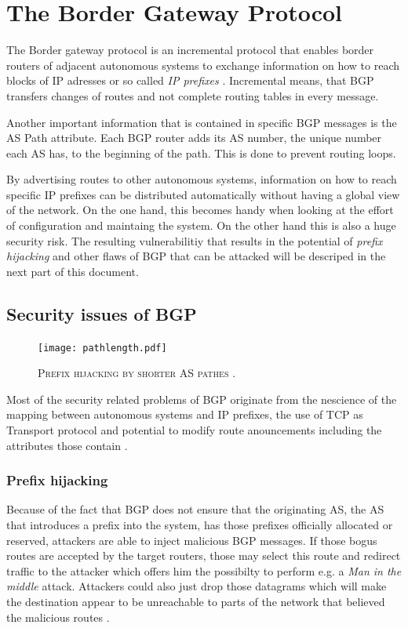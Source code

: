 \documentclass[12pt,a4paper]{IEEEtran}
\begin{document}
	\section{The Border Gateway Protocol}
	The Border gateway protocol is an incremental protocol that enables border routers of adjacent autonomous systems to exchange information on how to reach blocks of IP adresses or so called \emph{IP prefixes} \citep{Butler2010}.
	Incremental means, that BGP transfers changes of routes and not complete routing tables in every message.

	Another important information that is contained in specific BGP messages is the  AS Path attribute. Each BGP router adds its AS number, the unique number each AS has, to the beginning of the path. This is done to prevent routing loops. 

	By advertising routes to other autonomous systems, information on how to reach specific IP prefixes can be distributed automatically without having a global view of the network. On the one hand, this becomes handy when looking at the effort of configuration and maintaing the system. On the other hand this is also a huge security risk.
	The resulting vulnerabilitiy that results in the potential of \emph{prefix hijacking} and other flaws of BGP that can be attacked will be descriped in the next part of this document. 
	
	\subsection{Security issues of BGP}
		\begin{figure}[ht!]
			\begin{center}
				\texttt{[image: pathlength.pdf]}
				\caption{\textsc{Prefix hijacking by shorter AS pathes \citep{Butler2010}.}}
			\end{center}
			\label{shortpath}
		\end{figure}
		Most of the security related problems of BGP originate from the nescience of the mapping between autonomous systems and IP prefixes, the use of TCP as Transport protocol and potential to modify route anouncements including the attributes those contain \citep{Butler2010}.

		\subsubsection{Prefix hijacking}
		Because of the fact that BGP does not ensure that the originating AS, the AS that introduces a prefix into the system, has those prefixes officially allocated or reserved, attackers are able to inject malicious BGP messages. 
		If those bogus routes are accepted by the target routers, those may select this route and redirect traffic to the attacker which offers him the possibilty to perform e.g. a \emph{Man in the middle} attack. Attackers could also just drop those datagrams which will make the destination appear to be unreachable to parts of the network that believed the malicious routes \citep{Butler2010}.
\end{document}
